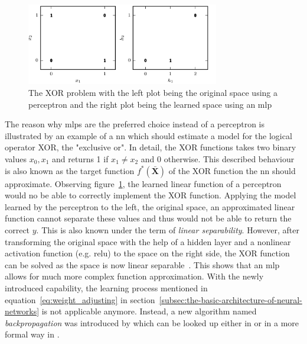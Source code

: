 \documentclass[draft,final]{vutinfth} %
\newcommand{\p}[1]{see p. #1}
\begin{document}
    \begin{figure}[h]
        \vspace{0.5cm}
        \centering
        \includegraphics[width=0.75\textwidth]{figures/xor_problem.png}
        \caption[The XOR problem with the left plot being the original space using a perceptron and the right plot being the learned space using an \gls{mlp}]{The XOR problem with the left plot being the original space using a perceptron and the right plot being the learned space using an \gls{mlp}\protect\footnotemark}
        \label{fig:xor_problem}
    \end{figure}

    \footnotetext{\cite[\p{168}]{goodfellow_deep_2016}}
    The reason why \glspl{mlp} are the preferred choice instead of a perceptron is illustrated by an example of a \gls{nn} which should estimate a model for the logical operator XOR, the "exclusive or".
    In detail, the XOR functions takes two binary values $x_0,x_1$ and returns 1 if $x_1 \neq x_2$ and 0 otherwise.
    This described behaviour is also known as the target function $f^*(\bar{\boldsymbol{X}})$ of the XOR function the \gls{nn} should approximate.
    Observing figure~\ref{fig:xor_problem}, the learned linear function of a perceptron would no be able to correctly implement the XOR function.
    Applying the model learned by the perceptron to the left, the original space, an approximated linear function cannot separate these values and thus would not be able to return the correct $y$.
    This is also known under the term of \textit{linear separability}.
    However, after transforming the original space with the help of a hidden layer and a nonlinear activation function (e.g. \gls{relu}) to the space on the right side, the XOR function can be solved as the space is now linear separable~\citep[\p{166ff}; \p{32ff}]{goodfellow_deep_2016,aggarwal_neural_2018}.
    This shows that an \gls{mlp} allows for much more complex function approximation.
    With the newly introduced capability, the learning process mentioned in equation~\ref{eq:weight_adjusting} in section~\ref{subsec:the-basic-architecture-of-neural-networks} is not applicable anymore.
    Instead, a new algorithm named \textit{backpropagation} was introduced by \citeauthor{rumelhart_learning_1986} which can be looked up either in \citet[\p{21}]{aggarwal_neural_2018} or in a more formal way in \citet[\p{197}]{goodfellow_deep_2016}.
\end{document}
